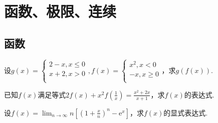\chapter{函数、极限、连续}\label{cha:1}
\section{函数}
\begin{xiti}
\item 设$g\left(x\right)=\left\{\begin{array}{l}
2-x,x\le 0\\
x+2,x>0\\
\end{array},f\left(x\right)=\left\{\begin{array}{l}
x^2,x<0\\
-x,x\geqslant 0\\
\end{array}\right.\right. 
$，求$g(f(x))$.

\item 已知$f(x)$满足等式$2 f ( x ) + x ^ { 2 } f \left( \frac { 1 } { x } \right) = \frac { x ^ { 2 } + 2 x } { x + 1 }$，求$f(x)$的表达式.
\item 设$f ( x ) = \lim _ { n \rightarrow \infty } n \left[ \left( 1 + \frac { x } { n } \right) ^ { n } - \mathrm { e } ^ { x } \right]$，求$f(x)$的显式表达式.


\end{xiti}
